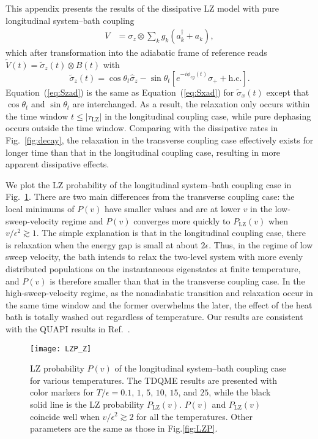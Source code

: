 \documentclass[english,nofootinbib, pra, twocolumn,superscriptaddress]{revtex4-1}
\begin{document}
This appendix presents the results of the dissipative LZ model with
pure longitudinal system--bath coupling
\begin{align}
V & =\sigma_{z}\otimes\sum_{k}g_{k}(a_{k}^{\dagger}+a_{k}),\label{eq:Vz}
\end{align}
which after transformation into the adiabatic frame of reference reads
$\tilde{V}(t)=\tilde{\sigma}_{z}(t)\otimes B(t)$ with
\begin{equation}
\tilde{\sigma}_{z}(t)=\cos\theta_{t}\hat{\sigma}_{z}-\sin\theta_{t}[e^{-i\phi_{eg}(t)}\hat{\sigma}_{+}+\text{h.c.}].\label{eq:Szad}
\end{equation}
Equation~(\ref{eq:Szad}) is the same as Equation~(\ref{eq:Sxad}) for $\tilde{\sigma}_{x}(t)$ except that $\cos\theta_{t}$ and
$\sin\theta_{t}$ are interchanged. As a result, the relaxation only occurs
within the time window $t\leq\vert\tau_{\text{LZ}}\vert$ in the longitudinal
coupling case, while pure dephasing occurs outside the time window.
Comparing with the dissipative rates in Fig.~\ref{fig:decay}, the relaxation
in the transverse coupling case effectively exists for longer time
than that in the longitudinal coupling case, resulting in more apparent
dissipative effects. 

We plot the LZ probability of the longitudinal system--bath coupling case in Fig.~\ref{fig:Pz}. There are two main differences from the transverse coupling
case: the local minimums of $P(v)$
have smaller values and are at lower $v$ in the low-sweep-velocity regime and
$P(v)$ converges more quickly to $P_{\text{LZ}}(v)$ when $v/\epsilon^{2}\gtrsim1$.
The simple explanation is that in the longitudinal coupling case,
there is relaxation when the energy gap is small at about $2\epsilon$.
Thus, in the regime of low sweep velocity, the bath intends to relax
the two-level system with more evenly distributed populations on the
instantaneous eigenstates at finite temperature, and $P(v)$
is therefore smaller than that in the transverse coupling case. In the high-sweep-velocity regime, as the nonadiabatic transition and relaxation occur in the same time window and the former overwhelms the later, the effect of the heat bath is totally washed out regardless of temperature. Our results are consistent with the QUAPI
results in Ref.~\citep{2009.Thorwart,2015.Thorwart}.

\begin{figure}[pbth]
\texttt{[image: LZP\_Z]}
\caption{LZ probability $P(v)$ of the longitudinal system--bath coupling
case for various temperatures. The TDQME results are
presented with color markers for $T/\epsilon=0.1$, $1$, $5$, $10$,
$15$, and $25$, while the black solid line is the LZ probability
$P_{\text{LZ}}(v)$. $P(v)$ and $P_{\text{LZ}}(v)$
coincide well when $v/\epsilon^{2}\gtrsim2$ for all the temperatures.
Other parameters are the same as those in Fig.\ref{fig:LZP}.}
\label{fig:Pz}
\end{figure}




\end{document}
